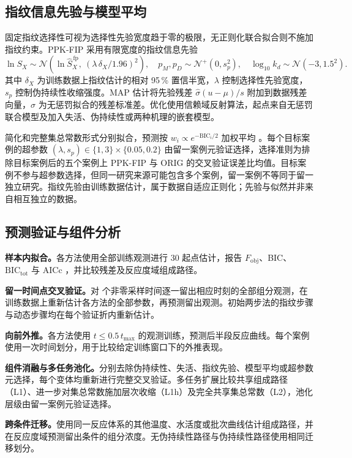 \subsection{指纹信息先验与模型平均}
固定指纹选择性可视为选择性先验宽度趋于零的极限，无正则化联合拟合则不施加指纹约束。PPK-FIP 采用有限宽度的指纹信息先验
\begin{equation}
\ln S_X\sim\mathcal N\!\left(\ln\hat S_X^{\,\mathrm{fp}},\ (\lambda\,\delta_X/1.96)^2\right),\quad p_M,p_D\sim\mathcal N^+(0,s_p^2),\quad \log_{10}k_d\sim\mathcal N(-3,1.5^2).\label{eq:prior}
\end{equation}
其中 $\delta_X$ 为训练数据上指纹估计的相对 95\,\% 置信半宽，$\lambda$ 控制选择性先验宽度，$s_p$ 控制伪持续性收缩强度。MAP 估计将先验残差 $\hat\sigma(u-\mu)/s$ 附加到数据残差向量，$\hat\sigma$ 为无惩罚拟合的残差标准差。优化使用信赖域反射算法，起点来自无惩罚联合模型及加入失活、伪持续性或两种机理的嵌套模型。

简化和完整集总常数形式分别拟合，预测按 $w_i\propto e^{-\mathrm{BIC}_i/2}$ 加权平均 \cite{hoeting1999,burnham2002}。每个目标案例的超参数 $(\lambda,s_p)\in\{1,3\}\times\{0.05,0.2\}$ 由留一案例元验证选择，选择准则为排除目标案例后的五个案例上 PPK-FIP 与 ORIG 的交叉验证误差比均值。目标案例不参与超参数选择，但同一研究来源可能包含多个案例，留一案例不等同于留一独立研究。指纹先验由训练数据估计，属于数据自适应正则化；先验与似然并非来自相互独立的数据。

\subsection{预测验证与组件分析}
\textbf{样本内拟合。}各方法使用全部训练观测进行 30 起点估计，报告 $F_\mathrm{obj}$、BIC、$\mathrm{BIC}_\mathrm{tot}$ 与 AICc \cite{hurvich1989}，并比较残差及反应度域组成路径。

\textbf{留一时间点交叉验证。}对 \NLotoFolds{} 个非零采样时间逐一留出相应时刻的全部组分观测，在训练数据上重新估计各方法的全部参数，再预测留出观测。初始两步法的指纹步骤与动态步骤均在每个验证折内重新估计。

\textbf{向前外推。}各方法使用 $t\le0.5\,t_\mathrm{max}$ 的观测训练，预测后半段反应曲线。每个案例使用一次时间划分，用于比较给定训练窗口下的外推表现。

\textbf{组件消融与多任务池化。}分别去除伪持续性、失活、指纹先验、模型平均或超参数元选择，每个变体均重新进行完整交叉验证。多任务扩展比较共享组成路径（L1）、进一步对集总常数施加层次收缩（L1h）及完全共享集总常数（L2），池化层级由留一案例元验证选择。

\textbf{跨条件迁移。}使用同一反应体系的其他温度、水活度或批次曲线估计组成路径，并在反应度域预测留出条件的组分浓度。无伪持续性路径与伪持续性路径使用相同迁移划分。

